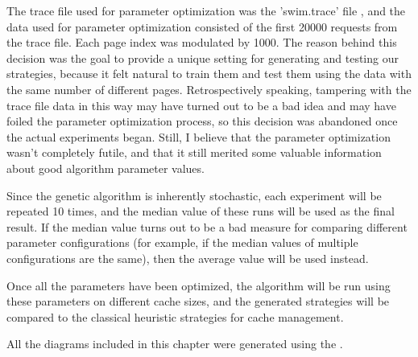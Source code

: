 The trace file used for parameter optimization was the 'swim.trace' file \citep{data}, and the data used for parameter optimization consisted of the first 20000 requests from the trace file. Each page index was modulated by 1000. The reason behind this decision was the goal to provide a unique setting for generating and testing our strategies, because it felt natural to train them and test them using the data with the same number of different pages. Retrospectively speaking, tampering with the trace file data in this way may have turned out to be a bad idea and may have foiled the parameter optimization process, so this decision was abandoned once the actual experiments began. Still, I believe that the parameter optimization wasn't completely futile, and that it still merited some valuable information about good algorithm parameter values.

Since the genetic algorithm is inherently stochastic, each experiment will be repeated 10 times, and the median value of these runs will be used as the final result. If the median value turns out to be a bad measure for comparing different parameter configurations (for example, if the median values of multiple configurations are the same), then the average value will be used instead.

Once all the parameters have been optimized, the algorithm will be run using these parameters on different cache sizes, and the generated strategies will be compared to the classical heuristic strategies for cache management.

All the diagrams included in this chapter were generated using the \citep{box_plots}.